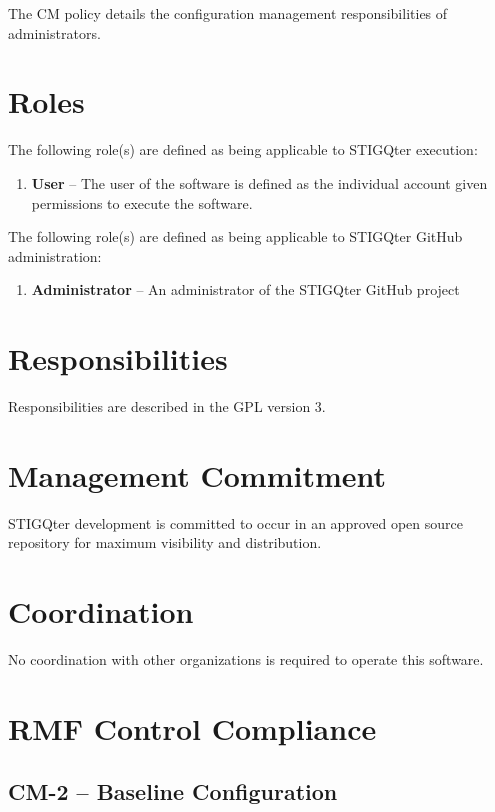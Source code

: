 \documentclass[letterpaper, 10pt, twoside]{article}
\begin{document}
The CM policy details the configuration management responsibilities of administrators.

\section{Roles}
\label{sec:roles}

The following role(s) are defined as being applicable to STIGQter execution:
\begin{enumerate}
	\item \textbf{User} -- The user of the software is defined as the individual account given permissions to execute the software.
\end{enumerate}

The following role(s) are defined as being applicable to STIGQter GitHub administration:
\begin{enumerate}
	\item \textbf{Administrator} -- An administrator of the STIGQter GitHub project
\end{enumerate}

\section{Responsibilities}
\label{sec:responsibilities}

Responsibilities are described in the GPL version 3.

\section{Management Commitment}

STIGQter development is committed to occur in an approved open source repository for maximum visibility and distribution.

\section{Coordination}

No coordination with other organizations is required to operate this software.

\section{RMF Control Compliance}

\subsection{CM-2 -- Baseline Configuration}
\end{document}

